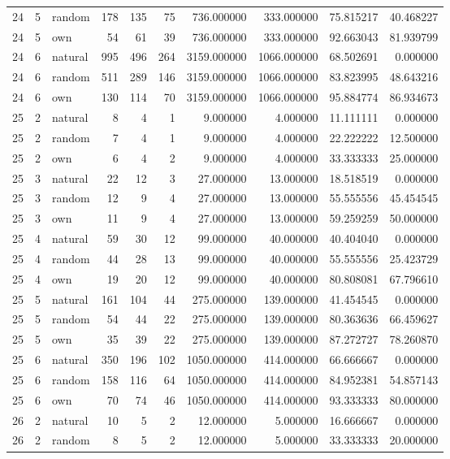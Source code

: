 \begin{table}[htbp]
\begin{tabular}{rrlrrrrrrr}
24 & 5 & random & 178 & 135 & 75 & 736.000000 & 333.000000 & 75.815217 & 40.468227 \\
24 & 5 & own & 54 & 61 & 39 & 736.000000 & 333.000000 & 92.663043 & 81.939799 \\
24 & 6 & natural & 995 & 496 & 264 & 3159.000000 & 1066.000000 & 68.502691 & 0.000000 \\
24 & 6 & random & 511 & 289 & 146 & 3159.000000 & 1066.000000 & 83.823995 & 48.643216 \\
24 & 6 & own & 130 & 114 & 70 & 3159.000000 & 1066.000000 & 95.884774 & 86.934673 \\
25 & 2 & natural & 8 & 4 & 1 & 9.000000 & 4.000000 & 11.111111 & 0.000000 \\
25 & 2 & random & 7 & 4 & 1 & 9.000000 & 4.000000 & 22.222222 & 12.500000 \\
25 & 2 & own & 6 & 4 & 2 & 9.000000 & 4.000000 & 33.333333 & 25.000000 \\
25 & 3 & natural & 22 & 12 & 3 & 27.000000 & 13.000000 & 18.518519 & 0.000000 \\
25 & 3 & random & 12 & 9 & 4 & 27.000000 & 13.000000 & 55.555556 & 45.454545 \\
25 & 3 & own & 11 & 9 & 4 & 27.000000 & 13.000000 & 59.259259 & 50.000000 \\
25 & 4 & natural & 59 & 30 & 12 & 99.000000 & 40.000000 & 40.404040 & 0.000000 \\
25 & 4 & random & 44 & 28 & 13 & 99.000000 & 40.000000 & 55.555556 & 25.423729 \\
25 & 4 & own & 19 & 20 & 12 & 99.000000 & 40.000000 & 80.808081 & 67.796610 \\
25 & 5 & natural & 161 & 104 & 44 & 275.000000 & 139.000000 & 41.454545 & 0.000000 \\
25 & 5 & random & 54 & 44 & 22 & 275.000000 & 139.000000 & 80.363636 & 66.459627 \\
25 & 5 & own & 35 & 39 & 22 & 275.000000 & 139.000000 & 87.272727 & 78.260870 \\
25 & 6 & natural & 350 & 196 & 102 & 1050.000000 & 414.000000 & 66.666667 & 0.000000 \\
25 & 6 & random & 158 & 116 & 64 & 1050.000000 & 414.000000 & 84.952381 & 54.857143 \\
25 & 6 & own & 70 & 74 & 46 & 1050.000000 & 414.000000 & 93.333333 & 80.000000 \\
26 & 2 & natural & 10 & 5 & 2 & 12.000000 & 5.000000 & 16.666667 & 0.000000 \\
26 & 2 & random & 8 & 5 & 2 & 12.000000 & 5.000000 & 33.333333 & 20.000000 \\

\end{tabular}
\end{table}
